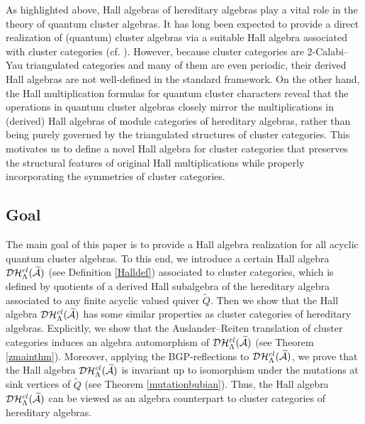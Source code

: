 \documentclass[reqno,12pt]{amsart}
\numberwithin{equation}{section}
\theoremstyle{plain} %
\theoremstyle{definition} %
\begin{document}
As highlighted above, Hall algebras of hereditary algebras play a vital role in the theory of quantum cluster algebras. It has long been expected to provide a direct realization of (quantum) cluster algebras via a suitable Hall algebra associated with cluster categories (cf. \cite{CC, CK2005}). However, because cluster categories are 2-Calabi--Yau triangulated categories and many of them are even periodic, their derived Hall algebras are not well-defined in the standard framework. On the other hand, the Hall multiplication formulas for quantum cluster characters reveal that the operations in quantum cluster algebras closely mirror the multiplications in (derived) Hall algebras of module categories of hereditary algebras, rather than being purely governed by the triangulated structures of cluster categories. This motivates us to define a novel Hall algebra for cluster categories that preserves the structural features of original Hall multiplications while properly incorporating the symmetries of cluster categories.



\subsection{Goal} The main goal of this paper is to provide a Hall algebra realization for all acyclic quantum cluster algebras. To this end, we introduce a certain Hall algebra $\mathcal {D}\mathcal {H}_\Lambda^{{cl}}(\widetilde{\mathcal{A}})$ (see Definition \ref{Halldef}) associated to cluster categories, which is defined by quotients of a derived Hall subalgebra of the hereditary algebra associated to any finite acyclic valued quiver $\widetilde{Q}$. Then we show that the Hall algebra $\mathcal {D}\mathcal {H}_\Lambda^{{cl}}(\widetilde{\mathcal{A}})$ has some similar properties as cluster categories of hereditary algebras. Explicitly, we show that the Auslander--Reiten translation of cluster categories induces an algebra automorphism of $\mathcal {D}\mathcal {H}_\Lambda^{{cl}}(\widetilde{\mathcal{A}})$ (see Theorem \ref{zmainthm}). Moreover, applying the BGP-reflections to $\mathcal {D}\mathcal {H}_\Lambda^{{cl}}(\widetilde{\mathcal{A}})$, we prove that the Hall algebra $\mathcal {D}\mathcal {H}_\Lambda^{{cl}}(\widetilde{\mathcal{A}})$ is invariant up to isomorphism under the mutations at sink vertices of $\widetilde{Q}$ (see Theorem \ref{mutationbubian}).
Thus, the Hall algebra $\mathcal {D}\mathcal {H}_\Lambda^{{cl}}(\widetilde{\mathcal{A}})$ can be viewed as an algebra counterpart to cluster categories of hereditary algebras.
\end{document}
